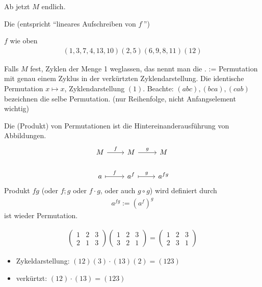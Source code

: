 Ab jetzt $M$ endlich.
\begin{definition}
	Die  (entspricht ``lineares Aufschreiben von $f^{\cdot}$'')
\end{definition}
\begin{example}
	$f$ wie oben
	\begin{align*}
		(1,3,7,4,13, 10)(2,5)(6,9,8,11)(12)	
	\end{align*}
\end{example}
Falls $M$ fest, Zyklen der Menge 1 weglassen, das nennt man die .  := Permutation mit genau einem Zyklus in der verkürtzten Zyklendarstellung. Die identische Permutation $x \mapsto x$, Zyklendarstellung $(1)$.
Beachte: $(abc),(bca),(cab)$ bezeichnen die selbe Permutation. (nur Reihenfolge, nicht Anfangselement wichtig)
\begin{definition}
	Die  (Produkt) von Permutationen ist die Hintereinanderausführung von Abbildungen.
	\[
	\begin{tikzcd}
		M \arrow[r, "f"]     & M \arrow[r, "g"]       & M      \\
		a \arrow[r, maps to, "f"] & a^f \arrow[r, maps to, "g"] & a^{fg}
	\end{tikzcd}
	\]
	Produkt $fg$ (oder $f;g$ oder $f\cdot g$, oder auch $g \circ g$) wird definiert durch 
	\begin{align*}
		a^{fg}:= (a^f)^g
	\end{align*} 
	ist wieder Permutation.
\end{definition}
\begin{example}
	\begin{align*}
		\begin{pmatrix}
			1 & 2 &3\\
			2 & 1 &3
		\end{pmatrix}
		\begin{pmatrix}
			1 & 2 & 3\\
			3 & 2 & 1
		\end{pmatrix}=
		\begin{pmatrix}
			1 & 2 & 3\\
			2 & 3 & 1
		\end{pmatrix}
	\end{align*}
	\begin{itemize}
		\item Zykeldarstellung: $(12)(3)\cdot (13)(2) = (123)$
		\item verkürtzt: $(12)\cdot(13) = (123)$ 
	\end{itemize}
\end{example}
